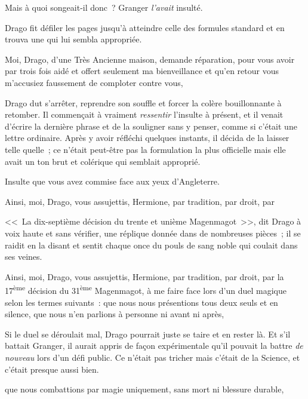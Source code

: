 Mais à quoi songeait-il donc~? Granger \emph{l'avait} insulté.

Drago fit défiler les pages jusqu'à atteindre celle des formules standard et en trouva une qui lui sembla appropriée.

\begin{writtenNote}
Moi, Drago, d'une Très Ancienne maison, demande réparation, pour vous avoir par trois fois aidé et offert seulement ma bienveillance et qu'en retour vous m'accusiez {faussement} de comploter contre vous, \end{writtenNote}

Drago dut s'arrêter, reprendre son souffle et forcer la colère bouillonnante à retomber. Il commençait à vraiment \emph{ressentir} l'insulte à présent, et il venait d'écrire la dernière phrase et de la souligner sans y penser, comme si c'était une lettre ordinaire. Après y avoir réfléchi quelques instants, il décida de la laisser telle quelle~; ce n'était peut-être pas la formulation la plus officielle mais elle avait un ton brut et colérique qui semblait approprié.

\begin{writtenNote}
Insulte que vous avez commise face aux yeux d'Angleterre.

Ainsi, moi, Drago, vous assujettis, Hermione, par tradition, par droit, par
\end{writtenNote}

<<~La dix-septième décision du trente et unième Magenmagot~>>, dit Drago à voix haute et sans vérifier, une réplique donnée dans de nombreuses pièces~; il se raidit en la disant et sentit chaque once du pouls de sang noble qui coulait dans ses veines.

\begin{writtenNote}
Ainsi, moi, Drago, vous assujettis, Hermione, par tradition, par droit, par la 17\textsuperscript{ème} décision du 31\textsuperscript{ème} Magenmagot, à me faire face lors d'un duel magique selon les termes suivants~: que nous nous présentions tous deux seuls et en silence, que nous n'en parlions à personne ni avant ni après,\end{writtenNote}

Si le duel se déroulait mal, Drago pourrait juste se taire et en rester là. Et s'il battait Granger, il aurait appris de façon expérimentale qu'il pouvait la battre \emph{de nouveau} lors d'un défi public. Ce n'était pas tricher mais c'était de la Science, et c'était presque aussi bien.

\begin{writtenNote}
que nous combattions par magie uniquement, sans mort ni blessure durable,
\end{writtenNote}

